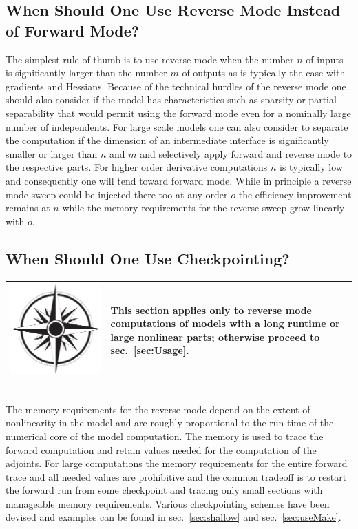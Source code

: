 \documentclass{book}
\newcommand{\refsec}[1]{{sec.~\ref{#1}}}
\newcommand{\nav}[1]{
\begin{tabular}{|m{.03\textwidth}|m{.92\textwidth}|}\hline
\vspace{1mm}
\includegraphics[width=.03\textwidth]{windrose_zh1}&
\vspace{1mm}
\begin{minipage}[c]{.86\textwidth}
\small {#1}
\end{minipage}
\vspace{1mm}
\\\hline
\end{tabular}
}
\begin{document}
\subsection{When Should One Use Reverse Mode Instead of Forward Mode?}\label{sec:reverseInsteadOfForward}
The simplest rule of thumb is to use reverse mode when the number $n$ of inputs is significantly larger than the 
number $m$  of outputs as is typically the case with gradients and Hessians. 
Because of the technical hurdles of the reverse mode one should also consider if the model 
has characteristics such as sparsity or  partial separability that would permit using the forward mode 
even for a nominally large number of independents. 
For large scale models one can also consider to separate the computation if the dimension 
of an intermediate interface is significantly smaller or larger than $n$ and $m$ 
and selectively apply forward and reverse mode to the respective parts. For higher order derivative 
computations $n$ is typically low and consequently one will tend toward 
forward mode. While in principle a reverse mode sweep could be injected there too at any order $o$ 
the efficiency improvement remains at $n$ while the memory requirements for the reverse sweep 
grow linearly with $o$.

\subsection{When Should One Use Checkpointing?}\label{sec:Checkpointing}
\nav{This section applies only to reverse mode computations of models with a long runtime or large  
nonlinear parts; otherwise proceed to \refsec{sec:Usage}.}\\[1ex]
The memory requirements for the reverse mode depend on the extent of nonlinearity in the model 
and are roughly proportional to the run time of the numerical core of the model computation.
The memory is used to trace the forward  computation and retain values needed for the computation 
of the adjoints. 
For large computations the memory requirements for the entire forward trace and all needed 
values are prohibitive and the common tradeoff is to restart the forward run from 
some checkpoint and tracing only small sections with manageable memory requirements. 
Various checkpointing schemes have been devised and examples can be found in \refsec{sec:shallow} 
and \refsec{sec:useMake}. 

\end{document}
